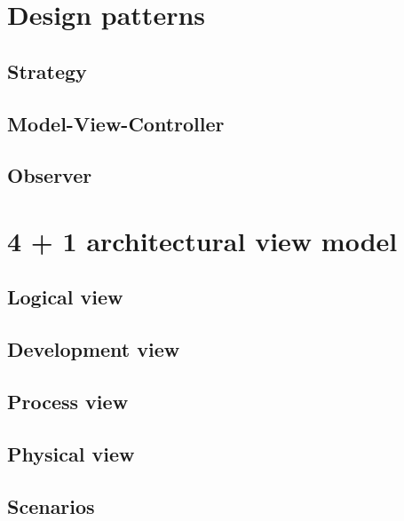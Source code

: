 \section{Design patterns}
\subsection{Strategy}
\subsection{Model-View-Controller}
\subsection{Observer}
\section{4 + 1 architectural view model}
\subsection{Logical view}
\subsection{Development view}
\subsection{Process view}
\subsection{Physical view}
\subsection{Scenarios}